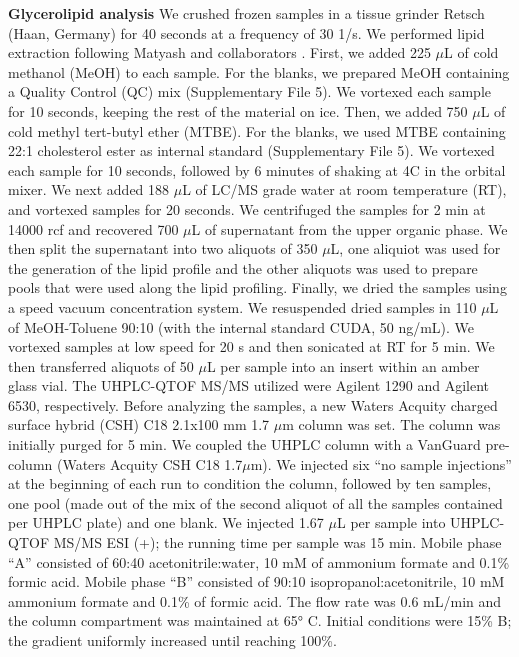 \documentclass[9pt,twocolumn,twoside,lineno]{BioRxiv}
\begin{document}
\textbf{Glycerolipid analysis} 
We crushed frozen samples in a tissue grinder Retsch (Haan, Germany) for 40 seconds at a frequency of 30 1/s. 
We performed lipid extraction following Matyash and collaborators \cite{Matyash2008-ue}. 
First, we added 225 $\mu$L of cold methanol (MeOH) to each sample. 
For the blanks, we prepared MeOH containing a Quality Control (QC) mix (Supplementary File 5).
We vortexed each sample for 10 seconds, keeping the rest of the material on ice. 
Then, we added 750 $\mu$L of cold methyl tert-butyl ether (MTBE). 
For the blanks, we used MTBE containing 22:1 cholesterol ester as internal standard (Supplementary File 5). 
We vortexed each sample for 10 seconds, followed by 6 minutes of shaking at 4\degree C in the orbital mixer. 
We next added 188 $\mu$L of LC/MS grade water at room temperature (RT), and vortexed samples for 20 seconds.
We centrifuged the samples for 2 min at 14000 rcf and recovered 700 $\mu$L of supernatant from the upper organic phase. 
We then split the supernatant into two aliquots of 350 $\mu$L, one aliquiot was used for the generation of the lipid profile and the other aliquots was used to prepare pools that were used along the lipid profiling. 
Finally, we dried the samples using a speed vacuum concentration system.
We resuspended dried samples in 110 $\mu$L of MeOH-Toluene 90:10 (with the internal standard CUDA, 50 ng/mL). 
We vortexed samples at low speed for 20 s and then sonicated at RT for 5 min. 
We then transferred aliquots of 50 $\mu$L per sample into an insert within an amber glass vial.
The UHPLC-QTOF MS/MS utilized were Agilent 1290 and Agilent 6530, respectively. 
Before analyzing the samples, a new Waters Acquity charged surface hybrid (CSH) C18 2.1x100 mm 1.7 $\mu$m column was set. 
The column was initially purged for 5 min. 
We coupled the UHPLC column with a VanGuard pre-column (Waters Acquity CSH C18 1.7$\mu$m). 
We injected six “no sample injections” at the beginning of each run to condition the column, followed by ten samples, one pool (made out of the mix of the second aliquot of all the samples contained per UHPLC plate) and one blank.
We injected 1.67 $\mu$L per sample into UHPLC-QTOF MS/MS ESI (+); the running time per sample was 15 min. 
Mobile phase “A” consisted of 60:40 acetonitrile:water, 10 mM of ammonium formate and 0.1\% formic acid. 
Mobile phase “B” consisted of 90:10 isopropanol:acetonitrile, 10 mM ammonium formate and 0.1\% of formic acid. 
The flow rate was 0.6 mL/min and the column compartment was maintained at 65° C. Initial conditions were 15\% B; the gradient uniformly increased until reaching 100\%. 
\end{document}
